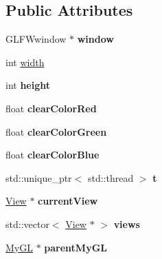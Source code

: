 \subsection*{Public Attributes}
\begin{DoxyCompactItemize}
\item 
G\+L\+F\+Wwindow $\ast$ {\bfseries window}\hypertarget{classWindow_a9957db4afdad3d57e5c5b6626b44b6d0}{}\label{classWindow_a9957db4afdad3d57e5c5b6626b44b6d0}

\item 
int \hyperlink{classWindow_af5b1c436782cc9752d386493fbc5dc8c}{width}
\item 
int {\bfseries height}\hypertarget{classWindow_af0ac1732ca6b79a6f6b78aa344140514}{}\label{classWindow_af0ac1732ca6b79a6f6b78aa344140514}

\item 
float {\bfseries clear\+Color\+Red}\hypertarget{classWindow_a59bb354c2ac5681ab524161dfb27e7ab}{}\label{classWindow_a59bb354c2ac5681ab524161dfb27e7ab}

\item 
float {\bfseries clear\+Color\+Green}\hypertarget{classWindow_a119464bee09e094873de036fd99f8e27}{}\label{classWindow_a119464bee09e094873de036fd99f8e27}

\item 
float {\bfseries clear\+Color\+Blue}\hypertarget{classWindow_a69e52b1eae97a94d6a45142b574f0cef}{}\label{classWindow_a69e52b1eae97a94d6a45142b574f0cef}

\item 
std\+::unique\+\_\+ptr$<$ std\+::thread $>$ {\bfseries t}\hypertarget{classWindow_a76199e6c3402c180d76133da74287f38}{}\label{classWindow_a76199e6c3402c180d76133da74287f38}

\item 
\hyperlink{classView}{View} $\ast$ {\bfseries current\+View}\hypertarget{classWindow_adb20638db6607fcf6aeb1d06ab6b73f5}{}\label{classWindow_adb20638db6607fcf6aeb1d06ab6b73f5}

\item 
std\+::vector$<$ \hyperlink{classView}{View} $\ast$ $>$ {\bfseries views}\hypertarget{classWindow_a25bf6f8672c20d053f6f4db8d059fedc}{}\label{classWindow_a25bf6f8672c20d053f6f4db8d059fedc}

\item 
\hyperlink{classMyGL}{My\+GL} $\ast$ {\bfseries parent\+My\+GL}\hypertarget{classWindow_a27b66f6aca412b9275fd09d0b203ea78}{}\label{classWindow_a27b66f6aca412b9275fd09d0b203ea78}

\end{DoxyCompactItemize}


